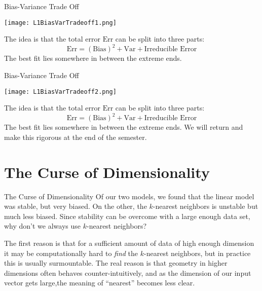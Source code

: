 \documentclass[10pt,handout]{beamer}
\begin{document}
\begin{frame}[fragile]{Bias-Variance Trade Off}
  \begin{minipage}[t][0.5\textheight][t]{\textwidth}
    \centering
     \texttt{[image: L1BiasVarTradeoff1.png]}
  \end{minipage}
  \vfill
  \begin{minipage}[t][0.5\textheight][t]{\textwidth}
The idea is that the total error $\text{Err}$ can be split into three parts:
$$
\text{Err} = (\text{Bias})^2 + \text{Var} + \text{Irreducible Error}
$$\pause
The best fit lies somewhere in between the extreme ends.
 \end{minipage}
\end{frame}






\begin{frame}[fragile]{Bias-Variance Trade Off}
  \begin{minipage}[t][0.5\textheight][t]{\textwidth}
    \centering
     \texttt{[image: L1BiasVarTradeoff2.png]}
  \end{minipage}
  \vfill
  \begin{minipage}[t][0.5\textheight][t]{\textwidth}
The idea is that the total error $\text{Err}$ can be split into three parts:
$$
\text{Err} = (\text{Bias})^2 + \text{Var} + \text{Irreducible Error}
$$
The best fit lies somewhere in between the extreme ends.
\pause
We will return and make this rigorous at the end of the semester. 
 \end{minipage}
\end{frame}





\section{The Curse of Dimensionality}


\begin{frame}[fragile]{The Curse of Dimensionality}
Of our two models, we found that the linear model was stable, but very biased. On the other, the $k$-nearest neighbors is unstable but much less biased. Since stability can be overcome with a large enough data set, why don't we always use $k$-nearest neighbors?\pause

The first reason is that for a sufficient amount of data of high enough dimension it may be computationally hard to \emph{find} the $k$-nearest neighbors, but in practice this is usually surmountable. The real reason is that geometry in higher dimensions often behaves counter-intuitively, and as the dimension of our input vector gets large,the meaning of ``nearest'' becomes less clear. 
\end{frame}
\end{document}
